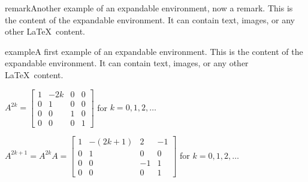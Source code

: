 \documentclass{ximera}
\begin{document}
\begin{expandable}{remark}{Another example of an expandable environment, now a remark.}
This is the content of the expandable environment. It can contain text, images, or any other \LaTeX\ content.
\end{expandable}

\begin{expandable}{example}{A first example of an expandable environment.}
    This is the content of the expandable environment. It can contain text, images, or any other \LaTeX\ content.
\end{expandable}



\begin{expandable}{}{}
    $
    A^{2k} = \left[ \begin{array}{rc|rr}
    1 & -2k & 0 & 0 \\
    0 & 1 & 0 & 0 \\
    \hline
    0 & 0 & 1 & 0 \\
    0 & 0 & 0 & 1
    \end{array} \right]$ for $k = 0, 1, 2, \dots$
    
    $A^{2k + 1} = A^{2k}A = \left[ \begin{array}{rc|rr}
    1 & -(2k + 1) & 2 & -1 \\
    0 & 1 & 0 & 0 \\
    \hline
    0 & 0 & -1 & 1 \\
    0 & 0 & 0 & 1
    \end{array} \right]$ for $k = 0, 1, 2, \dots$
\end{expandable}




\hrulefill
\end{document}
